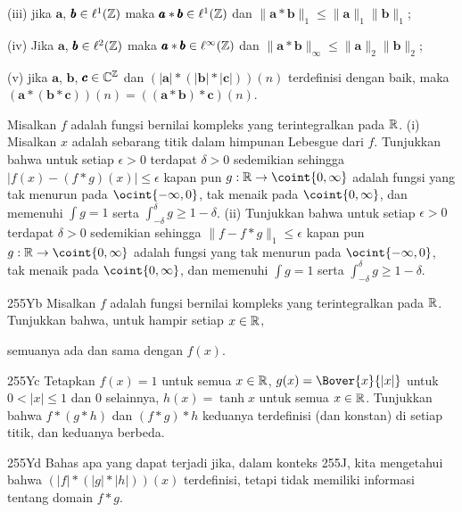 {\quad (iii) jika $\pmb{a}$, $\pmb{b}\in\ell^1(\Bbb Z)$ maka
$\pmb{a}*\pmb{b}\in\ell^1(\Bbb Z)$ dan
$\|\pmb{a}*\pmb{b}\|_1\le\|\pmb{a}\|_1\|\pmb{b}\|_1$;

\quad (iv) Jika $\pmb{a}$, $\pmb{b}\in\ell^2(\Bbb Z)$ maka
$\pmb{a}*\pmb{b}\in\ell^{\infty}(\Bbb Z)$ dan
$\|\pmb{a}*\pmb{b}\|_{\infty}\le\|\pmb{a}\|_2\|\pmb{b}\|_2$;

\quad (v) jika $\pmb{a}$, $\pmb{b}$, $\pmb{c}\in\Bbb C^{\Bbb Z}$ dan
$(|\pmb{a}|*(|\pmb{b}|*|\pmb{c}|))(n)$ terdefinisi dengan baik, maka
$(\pmb{a}*(\pmb{b}*\pmb{c}))(n)=((\pmb{a}*\pmb{b})*\pmb{c})(n)$.

Misalkan $f$ adalah fungsi bernilai kompleks yang terintegralkan
pada $\Bbb R$.   (i) Misalkan $x$ adalah sebarang titik dalam himpunan Lebesgue dari $f$.
Tunjukkan bahwa untuk setiap $\epsilon>0$ terdapat $\delta>0$ sedemikian sehingga
$|f(x)-(f*g)(x)|\le\epsilon$ kapan pun $g:\Bbb R\to\coint{0,\infty}$ adalah
fungsi yang tak menurun pada $\ocint{-\infty,0}$, tak menaik
pada $\coint{0,\infty}$, dan memenuhi $\int g=1$ serta
$\int_{-\delta}^{\delta}g\ge 1-\delta$.   (ii) Tunjukkan bahwa untuk setiap
$\epsilon>0$ terdapat $\delta>0$ sedemikian sehingga $\|f-f*g\|_1\le\epsilon$
kapan pun $g:\Bbb R\to\coint{0,\infty}$ adalah fungsi yang
tak menurun pada $\ocint{-\infty,0}$, tak menaik pada
$\coint{0,\infty}$, dan memenuhi $\int g=1$ serta
$\int_{-\delta}^{\delta}g\ge 1-\delta$.

\spheader 255Yb Misalkan $f$ adalah fungsi bernilai kompleks yang terintegralkan
pada $\Bbb R$.   Tunjukkan bahwa, untuk hampir setiap $x\in\Bbb R$,



\noindent semuanya ada dan sama dengan $f(x)$.   

\spheader 255Yc
Tetapkan $f(x)=1$ untuk semua $x\in\Bbb R$, $g(x)=\Bover{x}{|x|}$
untuk $0<|x|\le 1$ dan $0$ selainnya, $h(x)=\tanh x$ untuk semua $x\in\Bbb R$.
Tunjukkan bahwa $f*(g*h)$ dan $(f*g)*h$ keduanya terdefinisi (dan konstan)
di setiap titik, dan keduanya berbeda.

\spheader 255Yd Bahas apa yang dapat terjadi jika, dalam konteks 255J, kita
mengetahui bahwa $(|f|*(|g|*|h|))(x)$ terdefinisi, tetapi tidak memiliki informasi tentang
domain $f*g$.

}
